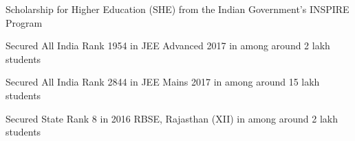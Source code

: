 \vspace{3mm}
\begin{cvitems}
  \item Scholarship for Higher Education (SHE) from the Indian Government's INSPIRE Program
  \item Secured All India Rank 1954 in JEE Advanced 2017 in among around 2 lakh students
  \item Secured All India Rank 2844 in JEE Mains 2017 in among around 15 lakh students
  \item Secured State Rank 8 in 2016 RBSE, Rajasthan (XII) in among around 2 lakh students
\end{cvitems}
\vspace{2mm}
